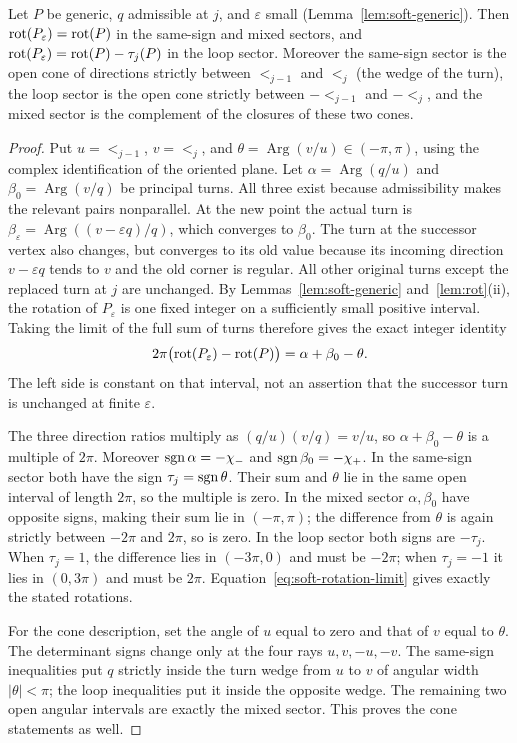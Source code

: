 \begin{lemma}\label{lem:soft-rotation}
Let $P$ be generic, $q$ admissible at $j$, and $\varepsilon$ small
(Lemma~\ref{lem:soft-generic}). Then $\operatorname{rot}(P_\varepsilon)=\operatorname{rot}(P)$ in the
same-sign and mixed sectors, and $\operatorname{rot}(P_\varepsilon)=\operatorname{rot}(P)-\tau_j(P)$ in
the loop sector. Moreover the same-sign sector is the open cone of directions
strictly between $\lt_{j-1}$ and $\lt_j$ (the wedge of the turn), the loop
sector is the open cone strictly between $-\lt_{j-1}$ and $-\lt_j$, and the
mixed sector is the complement of the closures of these two cones.
\end{lemma}
\begin{proof}
Put $u=\lt_{j-1}$, $v=\lt_j$, and
$\theta=\operatorname{Arg}(v/u)\in(-\pi,\pi)$, using the complex
identification of the oriented plane. Let
$\alpha=\operatorname{Arg}(q/u)$ and
$\beta_0=\operatorname{Arg}(v/q)$ be principal turns. All three
exist because admissibility makes the relevant pairs nonparallel.
At the new point the actual turn is
$\beta_\varepsilon=\operatorname{Arg}((v-\varepsilon q)/q)$,
which converges to $\beta_0$. The turn at the successor vertex also
changes, but converges to its old value because its incoming direction
$v-\varepsilon q$ tends to $v$ and the old corner is regular.
All other original turns except the replaced turn at $j$ are unchanged.
By Lemmas~\ref{lem:soft-generic} and~\ref{lem:rot}(ii), the rotation
of $P_\varepsilon$ is one fixed integer on a sufficiently small
positive interval. Taking the limit of the full sum of turns therefore
gives the exact integer identity
\begin{equation}\label{eq:soft-rotation-limit}
2\pi\bigl(\operatorname{rot}(P_\varepsilon)-\operatorname{rot}(P)\bigr)
=\alpha+\beta_0-\theta.
\end{equation}
The left side is constant on that interval, not an assertion that the
successor turn is unchanged at finite $\varepsilon$.

The three direction ratios multiply as $(q/u)(v/q)=v/u$, so
$\alpha+\beta_0-\theta$ is a multiple of $2\pi$.
Moreover $\operatorname{sgn}\alpha=-\chi_-$ and $\operatorname{sgn}\beta_0=-\chi_+$.
In the same-sign sector both have the sign $\tau_j=\operatorname{sgn}\theta$.
Their sum and $\theta$ lie in the same open interval of length $2\pi$,
so the multiple is zero. In the mixed sector $\alpha,\beta_0$ have
opposite signs, making their sum lie in $(-\pi,\pi)$; the difference
from $\theta$ is again strictly between $-2\pi$ and $2\pi$, so is zero.
In the loop sector both signs are $-\tau_j$. When $\tau_j=1$,
the difference lies in $(-3\pi,0)$ and must be $-2\pi$; when
$\tau_j=-1$ it lies in $(0,3\pi)$ and must be $2\pi$.
Equation~\eqref{eq:soft-rotation-limit} gives exactly the stated rotations.

For the cone description, set the angle of $u$ equal to zero and that
of $v$ equal to $\theta$. The determinant signs change only at the
four rays $u,v,-u,-v$. The same-sign inequalities put $q$ strictly
inside the turn wedge from $u$ to $v$ of angular width $|\theta|<\pi$;
the loop inequalities put it inside the opposite wedge. The remaining
two open angular intervals are exactly the mixed sector. This proves
the cone statements as well.
\end{proof}

